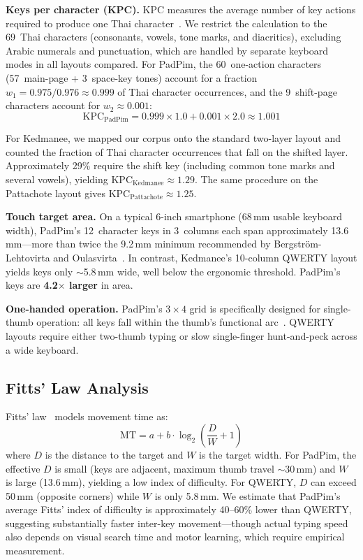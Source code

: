 \documentclass[10pt,twocolumn,a4paper]{article}
\begin{document}
\textbf{Keys per character (KPC).}
KPC measures the average number of key actions required to produce one Thai character~\cite{soukoreff2003,mackenzie2002}.
We restrict the calculation to the 69~Thai characters (consonants, vowels, tone marks, and diacritics), excluding Arabic numerals and punctuation, which are handled by separate keyboard modes in all layouts compared.
For PadPim, the 60~one-action characters (57~main-page + 3~space-key tones) account for a fraction $w_1 = 0.975 / 0.976 \approx 0.999$ of Thai character occurrences, and the 9~shift-page characters account for $w_2 \approx 0.001$:
$$
\text{KPC}_{\text{PadPim}} = 0.999 \times 1.0 + 0.001 \times 2.0 \approx 1.001
$$

For Kedmanee, we mapped our corpus onto the standard two-layer layout and counted the fraction of Thai character occurrences that fall on the shifted layer.
Approximately 29\% require the shift key (including common tone marks and several vowels), yielding $\text{KPC}_{\text{Kedmanee}} \approx 1.29$.
The same procedure on the Pattachote layout gives $\text{KPC}_{\text{Pattachote}} \approx 1.25$.

\textbf{Touch target area.}
On a typical 6-inch smartphone (68\,mm usable keyboard width), PadPim's 12~character keys in 3~columns each span approximately 13.6\,mm---more than twice the 9.2\,mm minimum recommended by Bergstr\"{o}m-Lehtovirta and Oulasvirta~\cite{bergstrom2014}.
In contrast, Kedmanee's 10-column QWERTY layout yields keys only $\sim$5.8\,mm wide, well below the ergonomic threshold.
PadPim's keys are \textbf{4.2$\times$ larger} in area.

\textbf{One-handed operation.}
PadPim's $3 \times 4$ grid is specifically designed for single-thumb operation: all keys fall within the thumb's functional arc~\cite{karlson2006}.
QWERTY layouts require either two-thumb typing or slow single-finger hunt-and-peck across a wide keyboard.

\subsection{Fitts' Law Analysis}
\label{sec:eval_fitts}

Fitts' law~\cite{fitts1954} models movement time as:
$$
\text{MT} = a + b \cdot \log_2\!\left(\frac{D}{W} + 1\right)
$$
where $D$ is the distance to the target and $W$ is the target width.
For PadPim, the effective $D$ is small (keys are adjacent, maximum thumb travel $\sim$30\,mm) and $W$ is large (13.6\,mm), yielding a low index of difficulty.
For QWERTY, $D$ can exceed 50\,mm (opposite corners) while $W$ is only 5.8\,mm.
We estimate that PadPim's average Fitts' index of difficulty is approximately 40--60\% lower than QWERTY, suggesting substantially faster inter-key movement---though actual typing speed also depends on visual search time and motor learning, which require empirical measurement.
\end{document}
